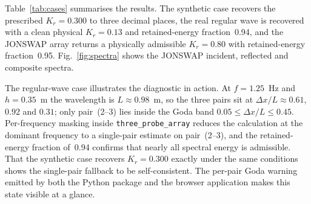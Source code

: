 \documentclass[preprint,12pt,a4paper]{elsarticle}
\begin{document}
Table~\ref{tab:cases} summarises the results. The synthetic case
recovers the prescribed $K_r = 0.300$ to three decimal places, the
real regular wave is recovered with a clean physical $K_r = 0.13$ and
retained-energy fraction~0.94, and the JONSWAP array returns a
physically admissible $K_r = 0.80$ with retained-energy
fraction~0.95. Fig.~\ref{fig:spectra} shows the JONSWAP incident,
reflected and composite spectra.

\begin{table}[!htbp]
\centering
\footnotesize
\setlength{\tabcolsep}{4pt}
\caption{Summary of the three illustrative cases analysed in
Section~\ref{sec:application}, the data file used and the
seaward-array gauge spacings $X_{12},X_{23}$ of each. For the
synthetic case a prescribed reflection coefficient $K_r=0.300$ was
imposed and recovered exactly. The regular-wave case uses the spacings
shown in Fig.~\ref{fig:expsetup}; the JONSWAP case uses the WaveLabX
browser-application default spacings. Data files are located under
\texttt{data/} in the repository; numbers are reproduced by
\texttt{scripts/multi\_example\_test.py} and stored in
\texttt{results/multi\_example\_results.csv}.}
\label{tab:cases}
\end{table}

The regular-wave case illustrates the diagnostic in action. At
$f=1.25$~Hz and $h=0.35$~m the wavelength is $L\approx 0.98$~m, so the
three pairs sit at $\Delta x/L\approx 0.61$, $0.92$ and $0.31$; only
pair~(2--3) lies inside the Goda band
$0.05\le\Delta x/L\le 0.45$. Per-frequency masking inside
\texttt{three\_probe\_array} reduces the calculation at the dominant
frequency to a single-pair estimate on pair~(2--3), and the
retained-energy fraction of~0.94 confirms that nearly all spectral
energy is admissible. That the synthetic case recovers $K_r=0.300$
exactly under the same conditions shows the single-pair fallback to be
self-consistent. The per-pair Goda warning emitted by both the Python
package and the browser application makes this state visible at a
glance.
\end{document}
